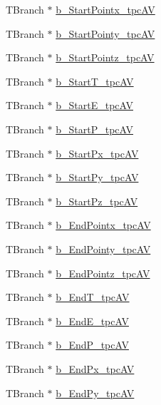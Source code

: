 \begin{DoxyCompactItemize}
T\-Branch $\ast$ \hyperlink{classanatree_a39a6d6068132509f343539aeeb53dd6f}{b\-\_\-\-Start\-Pointx\-\_\-tpc\-A\-V}
\item 
T\-Branch $\ast$ \hyperlink{classanatree_a8187437d9bcecf12e826a215dadee1fe}{b\-\_\-\-Start\-Pointy\-\_\-tpc\-A\-V}
\item 
T\-Branch $\ast$ \hyperlink{classanatree_aff26c16883d4af1e52829ef6729925ee}{b\-\_\-\-Start\-Pointz\-\_\-tpc\-A\-V}
\item 
T\-Branch $\ast$ \hyperlink{classanatree_ab314692ec0ba05ed5c3a529129d85777}{b\-\_\-\-Start\-T\-\_\-tpc\-A\-V}
\item 
T\-Branch $\ast$ \hyperlink{classanatree_ad5cbd53ea587b39df210918c4ae78309}{b\-\_\-\-Start\-E\-\_\-tpc\-A\-V}
\item 
T\-Branch $\ast$ \hyperlink{classanatree_aee754e1c862c439707739f665c0ad321}{b\-\_\-\-Start\-P\-\_\-tpc\-A\-V}
\item 
T\-Branch $\ast$ \hyperlink{classanatree_a2535d5d8b75d3c6adba23207708ffe31}{b\-\_\-\-Start\-Px\-\_\-tpc\-A\-V}
\item 
T\-Branch $\ast$ \hyperlink{classanatree_a4cf7771810d042b4c5417a2624a2d266}{b\-\_\-\-Start\-Py\-\_\-tpc\-A\-V}
\item 
T\-Branch $\ast$ \hyperlink{classanatree_a49262af6a270051a737f05a7d84ee343}{b\-\_\-\-Start\-Pz\-\_\-tpc\-A\-V}
\item 
T\-Branch $\ast$ \hyperlink{classanatree_a4e6d9004d80bf7ac8e45795bef1593ab}{b\-\_\-\-End\-Pointx\-\_\-tpc\-A\-V}
\item 
T\-Branch $\ast$ \hyperlink{classanatree_a4728f465c7867757087d2ec96d2a93bf}{b\-\_\-\-End\-Pointy\-\_\-tpc\-A\-V}
\item 
T\-Branch $\ast$ \hyperlink{classanatree_a55f7afc2c736633d60116620d8cac30b}{b\-\_\-\-End\-Pointz\-\_\-tpc\-A\-V}
\item 
T\-Branch $\ast$ \hyperlink{classanatree_aa9cbc2eb1c9c390f5f59b76c20ff57df}{b\-\_\-\-End\-T\-\_\-tpc\-A\-V}
\item 
T\-Branch $\ast$ \hyperlink{classanatree_aaabafd243f67ea6c3c38d1ce42140b98}{b\-\_\-\-End\-E\-\_\-tpc\-A\-V}
\item 
T\-Branch $\ast$ \hyperlink{classanatree_a7fc68907c81bf041b369a7fb74760d82}{b\-\_\-\-End\-P\-\_\-tpc\-A\-V}
\item 
T\-Branch $\ast$ \hyperlink{classanatree_ade7c06619154a623b5c00885361c879e}{b\-\_\-\-End\-Px\-\_\-tpc\-A\-V}
\item 
T\-Branch $\ast$ \hyperlink{classanatree_aa8d1182a6197f559eb1fb95579b03c98}{b\-\_\-\-End\-Py\-\_\-tpc\-A\-V}

\end{DoxyCompactItemize}
